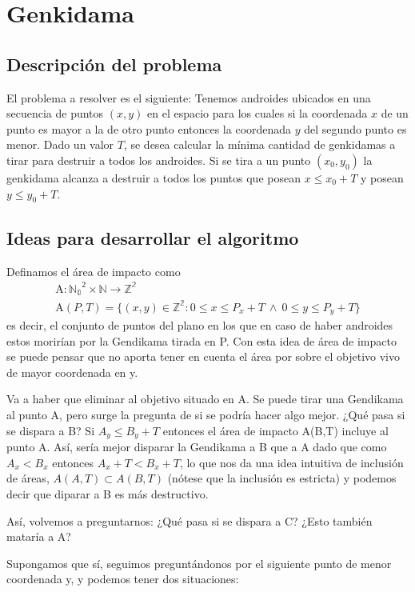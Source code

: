 \documentclass[10pt,a4paper]{article}
\begin{document}

\section{Genkidama}

\subsection{Descripción del problema}

El problema a resolver es el siguiente:
Tenemos androides ubicados en una secuencia de puntos $(x,y)$ en el espacio para los cuales si la coordenada $x$ de un punto es mayor a la de otro punto entonces la coordenada $y$ del segundo punto es menor. Dado un valor $T$, se desea calcular la mínima cantidad de genkidamas a tirar para destruir a todos los androides. Si se tira a un punto $(x_{0},y_{0})$ la genkidama alcanza a destruir a todos los puntos que posean $x \leq x_{0} + T$ y posean $y \leq y_{0} + T$.\\

\subsection{Ideas para desarrollar el algoritmo}

Definamos el área de impacto como
\begin{gather*}
\textrm{A}:\mathbb{N_{0}}^2 \times \mathbb{N} \rightarrow \mathbb{Z^2}\\
 \textrm{A}(P,T) = \{ (x, y) \in \mathbb{Z^2} : 0 \leq x \leq P_{x}+T ~ \wedge ~ 0 \leq y \leq P_{y}+T \}
\end{gather*}
 es decir, el conjunto de puntos del plano en los que en caso de haber androides estos morirían por la Gendikama tirada en P. Con esta idea de área de impacto se puede pensar que no aporta tener en cuenta el área por sobre el objetivo vivo de mayor coordenada en y.
\par{Va a haber que eliminar al objetivo situado en A. Se puede tirar una Gendikama al punto A, pero surge la pregunta de si se podría hacer algo mejor. ¿Qué pasa si se dispara a B? Si $ A_{y} \leq B_{y}+T$ entonces el área de impacto A(B,T) incluye al punto A. Así, sería mejor disparar la Gendikama a B que a A dado que como  $A_{x} < B_{x}$ entonces  $A_{x}+T < B_{x}+T$, lo que nos da una idea intuitiva de inclusión de áreas, $A(A,T) \subset A(B,T)$ (nótese que la inclusión es estricta) y podemos decir que diparar a B es más destructivo.}
\par{Así, volvemos a preguntarnos: ¿Qué pasa si se dispara a C? ¿Esto también mataría a A?}
\par{Supongamos que sí, seguimos preguntándonos por el siguiente punto de menor coordenada y, y podemos tener dos situaciones:}
\end{document}
